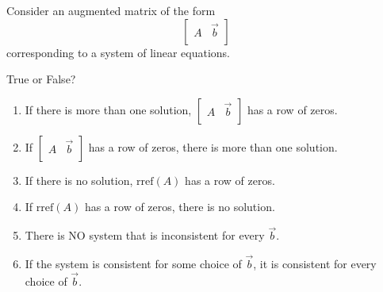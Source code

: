 \documentclass{ximera}
\begin{document}
\begin{exercise}
Consider an augmented matrix of the form
$$\left[\begin{array}{c|c}
 A & \vec{b}\\
 \end{array}\right]$$
 corresponding to a system of linear equations.
 
 True or False?
 
 \begin{enumerate}
     \item If there is more than one solution, $\left[\begin{array}{c|c}
 A & \vec{b}\\
 \end{array}\right]$ has a row of zeros.
 
 \begin{multipleChoice}
 \end{multipleChoice}
 
 \item If $\left[\begin{array}{c|c}
 A & \vec{b}\\
 \end{array}\right]$ has a row of zeros, there is more than one solution.
 
 \begin{multipleChoice}
 \end{multipleChoice}
 
 \item If there is no solution, $\mbox{rref}(A)$ has a row of zeros.
 
 \begin{multipleChoice}
 \end{multipleChoice}
 
 \item If $\mbox{rref}(A)$ has a row of zeros, there is no solution.
 
 \begin{multipleChoice}
 \end{multipleChoice}
 
 \item There is NO system that is inconsistent for every $\vec{b}$.
 
 \begin{multipleChoice}
 \end{multipleChoice}
 
 \item If the system is consistent for some choice of $\vec{b}$, it is consistent for every choice of $\vec{b}$.
 
 \begin{multipleChoice}
 \end{multipleChoice}
 \end{enumerate}
\end{exercise}
\end{document}
